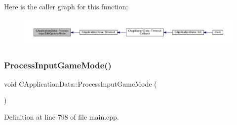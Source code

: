 Here is the caller graph for this function\+:\nopagebreak
\begin{figure}[H]
\begin{center}
\leavevmode
\includegraphics[width=350pt]{classCApplicationData_a345f47a19a5abcc9aeeb6b02b4aaf31b_icgraph}
\end{center}
\end{figure}
\hypertarget{classCApplicationData_a018490e670662ed9a9266449516a2ac7}{}\label{classCApplicationData_a018490e670662ed9a9266449516a2ac7} 
\subsubsection{\texorpdfstring{Process\+Input\+Game\+Mode()}{ProcessInputGameMode()}}
{\footnotesize\ttfamily void C\+Application\+Data\+::\+Process\+Input\+Game\+Mode (\begin{DoxyParamCaption}{ }\end{DoxyParamCaption})\hspace{0.3cm}{\ttfamily [protected]}}



Definition at line 798 of file main.\+cpp.



